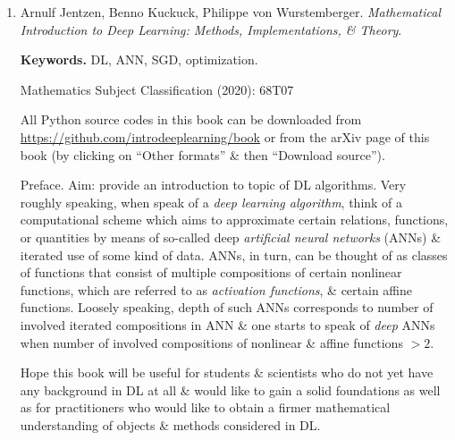 \documentclass{article}
\begin{document}
\begin{enumerate}
	\item {\sc Arnulf Jentzen, Benno Kuckuck, Philippe von Wurstemberger}. {\it Mathematical Introduction to Deep Learning: Methods, Implementations, \& Theory}.
	
	{\bf Keywords.} DL, ANN, SGD, optimization.
	
	Mathematics Subject Classification (2020): 68T07
	
	All Python source codes in this book can be downloaded from \url{https://github.com/introdeeplearning/book} or from the arXiv page of this book (by clicking on ``Other formats'' \& then ``Download source'').
	
	{\sf Preface.} Aim: provide an introduction to topic of DL algorithms. Very roughly speaking, when speak of a {\it deep learning algorithm}, think of a computational scheme which aims to approximate certain relations, functions, or quantities by means of so-called deep {\it artificial neural networks} (ANNs) \& iterated use of some kind of data. ANNs, in turn, can be thought of as classes of functions that consist of multiple compositions of certain nonlinear functions, which are referred to as {\it activation functions}, \& certain affine functions. Loosely speaking, depth of such ANNs corresponds to number of involved iterated compositions in ANN \& one starts to speak of {\it deep} ANNs when number of involved compositions of nonlinear \& affine functions $> 2$.
	
	Hope this book will be useful for students \& scientists who do not yet have any background in DL at all \& would like to gain a solid foundations as well as for practitioners who would like to obtain a firmer mathematical understanding of objects \& methods considered in DL.
	

\end{enumerate}
\end{document}
